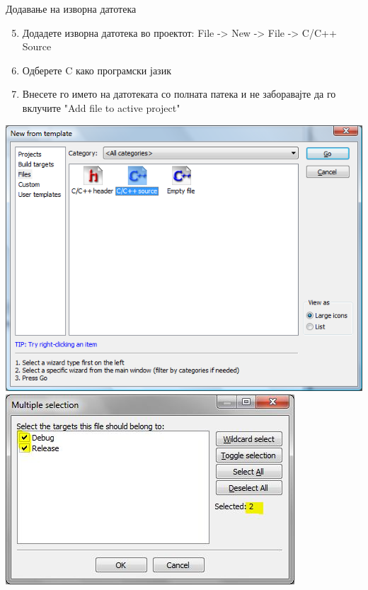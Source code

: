 \begin{frame}{Додавање на изворна датотека}
\begin{enumerate}
\setcounter{enumi}{4}
  \item Додадете изворна датотека во проектот: File -> New -> File -> C/C++
  Source
  \item Одберете C како програмски јазик 
  \item Внесете го името на датотеката со полната патека и не заборавајте да го
  вклучите  "Add file to active project"
\end{enumerate}
\begin{center}
\includegraphics[scale=0.25]{images/cb_source}
\includegraphics[scale=0.4]{images/cb_include}
\end{center}
\end{frame}

